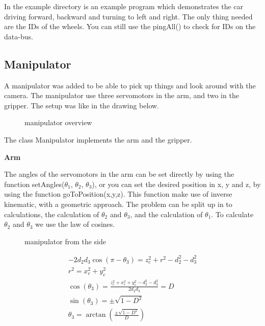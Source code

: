 In the example directory is an example program which demonstrates the car driving forward, backward and turning to left and right. The only thing needed are the IDs of the wheels. You can still use the pingAll() to check for IDs on the data-bus.

\subsection{Manipulator}

A manipulator was added to be able to pick up things and look around with the camera. The manipulator use three servomotors in the arm, and two in the gripper. The setup was like in the drawing below.

\begin{figure}[H]
    \centering
    \caption{manipulator overview}
    \label{fig:manipulator} 
\end{figure}

The class Manipulator implements the arm and the gripper.
\bigskip

\textbf{Arm}

The angles of the servomotors in the arm can be set directly by using the function setAngles($\theta_{1}$, $\theta_{2}$, $\theta_{3}$), or you can set the desired position in x, y and z, by using the function goToPosition(x,y,z). This function make use of inverse kinematic, with a geometric approach. 
The problem can be split up in to calculations, the calculation of $\theta_{2}$ and $\theta_{3}$, and the calculation of $\theta_{1}$. To calculate $\theta_{2}$ and $\theta_{3}$ we use the law of cosines.

\begin{figure}[H]
    \centering
    \caption{manipulator from the side}
    \label{fig:manipulator_side} 
\end{figure}

\begin{displaymath}
\begin{split}
-2d_{2}d_{3}\cos(\pi - \theta_{3}) = z_{c}^2 + r^2 - d_{2}^2 - d_{3}^2\\
r^2 = x_{c}^2 + y_{c}^2\\
\cos(\theta_{3}) = \frac{z_{c}^2 + x_{c}^2 + y_{c}^2 - d_{2}^2 - d_{3}^2}{2d_{2}d_{3}} = D\\
\sin(\theta_{3}) = \pm\sqrt{1-D^2}\\
\theta_{3} = \arctan(\frac{\pm\sqrt{1-D^2}}{D})
\end{split}
\end{displaymath}

